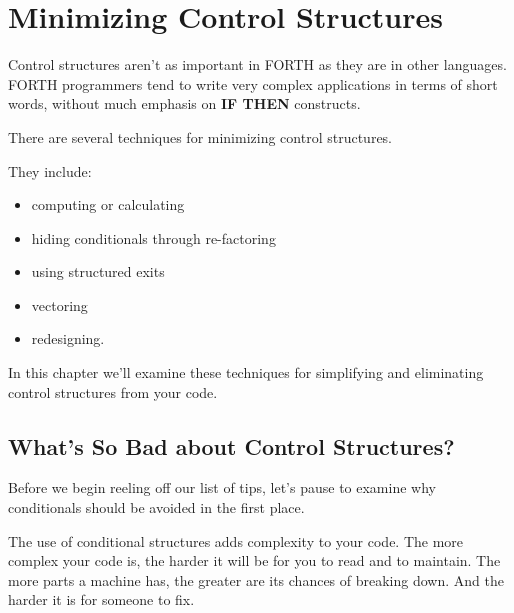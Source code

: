 

\chapter{Minimizing Control Structures}

Control structures aren't as important in FORTH as they are in other
languages. FORTH programmers tend to write very complex applications
in terms of short words, without much emphasis on \textbf{IF THEN}
constructs.

There are several techniques for minimizing control structures.

They include:

\begin{itemize}
\item computing or calculating
\item hiding conditionals through re-factoring
\item using structured exits
\item vectoring
\item redesigning.
\end{itemize}

In this chapter we'll examine these techniques for simplifying and
eliminating control structures from your code.

\section{What's So Bad about Control Structures?}

Before we begin reeling off our list of tips, let's pause to examine why
conditionals should be avoided in the first place.

The use of conditional structures adds complexity to your code. The
more complex your code is, the harder it will be for you to read and to
maintain. The more parts a machine has, the greater are its chances of
breaking down. And the harder it is for someone to fix.

